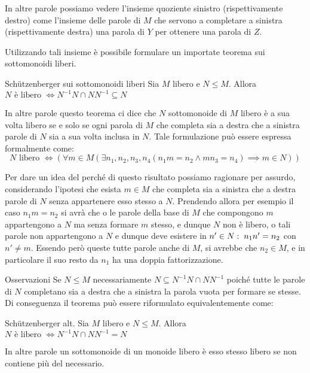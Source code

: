 In altre parole possiamo vedere l'insieme quoziente sinistro (rispettivamente destro) come l'insieme delle parole di \(M\) che servono a completare a sinistra (rispettivamente destra) una parola di \(Y\) per ottenere una parola di \(Z\).

Utilizzando tali insieme è possibile formulare un importate teorema sui sottomonoidi liberi.

\begin{theorem}[label=thm:schützenberger_monoids]{Schützenberger sui sottomonoidi liberi}
  Sia \(M\) libero e \(N \leq M\). Allora \(N \text{ è libero } \iff N^{-1}N \cap NN^{-1} \subseteq N\)
\end{theorem}
In altre parole questo teorema ci dice che \(N\) sottomonoide di \(M\) libero è a sua volta libero se e solo se ogni parola di \(M\) che completa sia a destra che a sinistra parole di \(N\) sia a sua volta inclusa in \(N\).
Tale formulazione può essere espressa formalmente come:
\[N \text{ libero } \iff \left(\forall m \in M (\exists n_1,n_2,n_3,n_4( n_1m=n_2 \land mn_3=n_4) \implies m \in N)\right)\]

Per dare un idea del perché di questo risultato possiamo ragionare per assurdo, considerando l'ipotesi che esista \(m \in M\) che completa sia a sinistra che a destra parole di \(N\) senza appartenere esso stesso a \(N\).
Prendendo allora per esempio il caso \(n_1m=n_2\) si avrà che o le parole della base di \(M\) che compongono \(m\) appartengono a \(N\) ma senza formare \(m\) stesso, e dunque \(N\) non è libero, o tali parole non appartengono a \(N\) e dunque deve esistere in \(n' \in N:\; n_1n'=n_2\) con \(n' \neq m\).
Essendo però queste tutte parole anche di \(M\), si avrebbe che \(n_2 \in M\), e in particolare il suo resto da \(n_1\) ha una doppia fattorizzazione.

\begin{note}{Osservazioni}
  Se \(N\leq M\) necessariamente \(N \subseteq N^{-1}N \cap NN^{-1}\) poiché tutte le parole di \(N\) completano sia a destra che a sinistra la parola vuota per formare se stesse.
  Di conseguenza il teorema può essere riformulato equivalentemente come:
  \begin{theorem}{Schützenberger alt.}
    Sia \(M\) libero e \(N \leq M\). Allora \(N \text{ è libero } \iff N^{-1}N \cap NN^{-1} = N\)
  \end{theorem}
  In altre parole un sottomonoide di un monoide libero è esso stesso libero se non contiene più del necessario.
\end{note}

